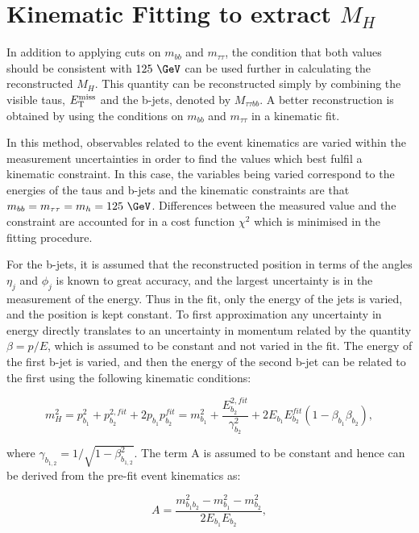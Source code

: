 \section{Kinematic Fitting to extract $M_{H}$}

In addition to applying cuts on $m_{bb}$ and $m_{\tau\tau}$, the condition that
both values should be consistent with $125~\GeV$ can be used further in
calculating the reconstructed $M_{H}$. This quantity can be reconstructed simply
by combining the visible taus, $E_{\mathrm{T}}^{\text{miss}}$ and the b-jets, denoted by $M_{\tau\tau bb}$.
A better reconstruction is obtained by using the conditions on $m_{bb}$ and
$m_{\tau\tau}$ in a kinematic fit. 

In this method, observables related to the
event kinematics are varied within the measurement uncertainties in order to
find the values which best fulfil a kinematic constraint. In this case, the
variables being varied correspond to the energies of the taus and b-jets and the
kinematic constraints are that $m_{bb} = m_{\tau\tau} = m_{h} = 125~\GeV$. Differences
between the measured value and the constraint are accounted for in a cost
function $\chi^{2}$ which is minimised in the fitting procedure.  

For the b-jets, it is assumed that the reconstructed position in terms of the
angles $\eta_{j}$ and $\phi_{j}$ is known to great accuracy, and the largest
uncertainty is in the measurement of the energy. Thus in the fit, only the
energy of the jets is varied, and the position is kept constant. To first
approximation any uncertainty in energy directly translates to an uncertainty in
momentum related by the quantity $\beta = p/E$, which is assumed to be constant and 
not varied in the fit. The energy of the first b-jet is varied, and then the
energy of the second b-jet can be related to the first using the following
kinematic conditions:

\begin{equation}
m_{H}^{2} = p_{b_{1}}^{2} + p_{b_{2}}^{2,fit} + 2p_{b_{1}}p_{b_{2}}^{fit} 
          = m_{b_{1}}^{2} + \frac{E_{b_{2}}^{2,fit}}{\gamma_{b_{2}}^{2}} + 2E_{b_{1}}E_{b_{2}}^{fit}\left(1-\beta_{b_{1}}\beta_{b_{2}}\right),   
\label{eq:bjetkinfit}         
\end{equation}

where $\gamma_{b_{1,2}} = 1/\sqrt{1-\beta_{b_{1,2}}^{2}}$. The term A is
assumed to be constant and hence can be derived from the pre-fit event
kinematics as:

\begin{equation}
A = \frac{m_{b_{1}b_{2}}^{2} - m_{b_{1}}^{2} - m_{b_{2}}^{2}}{2E_{b_{1}}E_{b_{2}}} , 
\end{equation}

